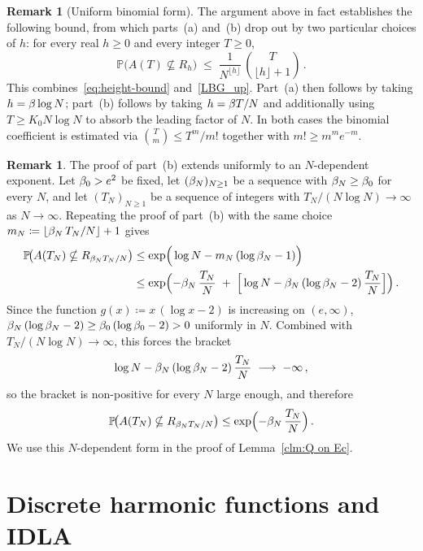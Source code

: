 \documentclass[11pt,a4paper,reqno]{amsart}
\theoremstyle{definition}
\newtheorem{Remark}[Theorem]{Remark}
\newcommand{\bbP}{{\ensuremath{\mathbb P}} }
\begin{document}
\begin{Remark}[Uniform binomial form]\label{rk:apriori-uniform}
The argument above in fact establishes the following bound, from which parts~(a) and~(b) drop out by two particular choices of $h$: for every real $h \geq 0$ and every integer $T \geq 0$,
	\[ \bbP\!\big( A(T) \nsubseteq R_h \big) \;\leq\; \frac{1}{N^{\lfloor h \rfloor}}\, \binom{T}{\lfloor h\rfloor + 1}\,. \]
This combines~\eqref{eq:height-bound} and~\eqref{LBG_up}. Part~(a) then follows by taking $h = \beta \log N$; part~(b) follows by taking $h = \beta T/N$ and additionally using $T \geq K_0 N \log N$ to absorb the leading factor of $N$. In both cases the binomial coefficient is estimated via $\binom{T}{m} \leq T^m/m!$ together with $m! \geq m^m e^{-m}$.
\end{Remark}

\begin{Remark}\label{rk:apriori-Ndep}
The proof of part~(b) extends uniformly to an $N$-dependent exponent. Let $\beta_0 > e^2$ be fixed, let $(\beta_N)_{N \geq 1}$ be a sequence with $\beta_N \geq \beta_0$ for every $N$, and let $(T_N)_{N \geq 1}$ be a sequence of integers with $T_N/(N \log N) \to \infty$ as $N \to \infty$. Repeating the proof of part~(b) with the same choice $m_N \coloneqq \lfloor \beta_N\, T_N/N\rfloor + 1$ gives
	\begin{align*}
	\bbP\!\big( A(T_N) \nsubseteq R_{\b_N T_N/N} \big)
	&\leq \exp\!\Big( \log N - m_N\,(\log\b_N - 1) \Big) \\
	&\leq \exp\!\Big( {-}\b_N\,\frac{T_N}{N}
	\;+\; \Big[\log N - \b_N\,(\log\b_N - 2)\,\frac{T_N}{N}\Big] \Big)\,.
	\end{align*}
Since the function $g(x) \coloneqq x\,(\log x - 2)$ is increasing on $(e, \infty)$, $\beta_N\,(\log\beta_N - 2) \geq \beta_0\,(\log\beta_0 - 2) > 0$ uniformly in $N$. Combined with $T_N/(N \log N) \to \infty$, this forces the bracket
	\[ \log N - \beta_N\,(\log\beta_N - 2)\,\frac{T_N}{N} \;\longrightarrow\; -\infty\,, \]
so the bracket is non-positive for every $N$ large enough, and therefore
	\[ \bbP\!\big( A(T_N) \nsubseteq R_{\b_N T_N/N} \big)
	\leq \exp\!\Big( {-}\b_N\,\frac{T_N}{N} \Big)\,. \]
We use this $N$-dependent form in the proof of Lemma~\ref{clm:Q on Ec}.
\end{Remark}


\section{Discrete harmonic functions and IDLA}\label{sec:preliminaries}
\end{document}
